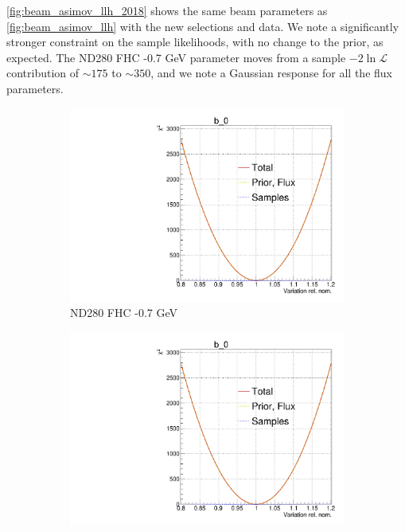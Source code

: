 \autoref{fig:beam_asimov_llh_2018} shows the same beam parameters as \autoref{fig:beam_asimov_llh} with the new selections and data. We note a significantly stronger constraint on the sample likelihoods, with no change to the prior, as expected. The ND280 FHC -0.7 GeV parameter moves from a sample $-2\ln\mathcal{L}$ contribution of $\sim175$ to $\sim350$, and we note a Gaussian response for all the flux parameters.
\begin{figure}[h]
	\centering
	\begin{subfigure}[t]{0.32\textwidth}
		\includegraphics[width=\textwidth, trim={0mm 0mm 0mm 11mm}, clip,page=5]{figures/mach3/2018/llh/tryBinningNumber6_after_fit_asimov_asimov_ND280logL_scan}
		\caption{ND280 FHC -0.7 GeV}
	\end{subfigure}
	\begin{subfigure}[t]{0.32\textwidth}
		\includegraphics[width=\textwidth, trim={0mm 0mm 0mm 11mm}, clip,page=13]{figures/mach3/2018/llh/tryBinningNumber6_after_fit_asimov_asimov_ND280logL_scan}

\end{subfigure}
\end{figure}
